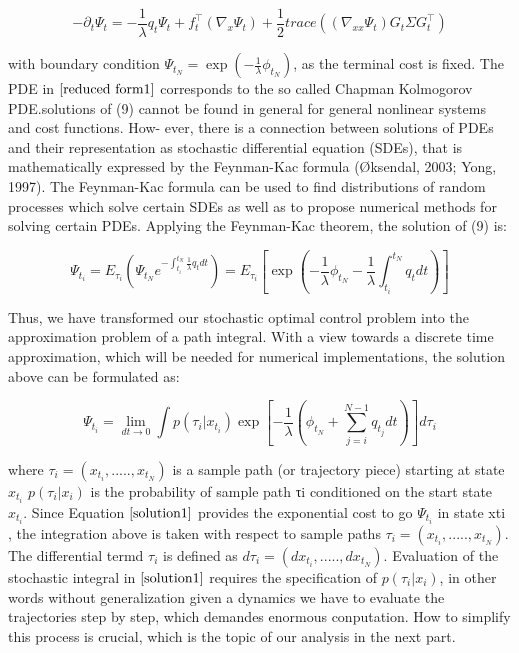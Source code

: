 \documentclass[journal]{IEEEtran}
\begin{document}
\begin{equation}
  -\partial_t \Psi_t = - \frac{1}{\lambda } q_t \Psi_t + f_t^{\top}(\nabla_x \Psi_t) + \frac{1}{2} trace((\nabla_{xx}\Psi_t)G_t \Sigma G_t^{\top})
  \label{reduced form1}
\end{equation}

with boundary condition $\Psi_{t_N} = \exp(-\frac{1}{\lambda} \phi_{t_N})$, as the terminal cost is fixed. The PDE in $\ref{reduced form1}$ 
corresponds to the so called Chapman Kolmogorov PDE.solutions of (9) cannot be found in general for general nonlinear systems and cost functions. How- ever, 
there is a connection between solutions of PDEs and their representation as stochastic differential equation (SDEs), that is mathematically expressed by the 
Feynman-Kac formula (Øksendal, 2003; Yong, 1997). 
The Feynman-Kac formula can be used to 
find distributions of random processes which solve certain SDEs as well as to propose numerical methods for solving certain PDEs. Applying the Feynman-Kac theorem, 
the solution of (9) is:

\begin{equation}
\Psi_{t_i} = E_{\tau_i}(\Psi_{t_N}e^{-\int_{t_i}^{t_N}\frac{1}{\lambda}q_tdt}) = E_{\tau_i}[\exp(-\frac{1}{\lambda}\phi_{t_N}-\frac{1}{\lambda}\int_{t_i}^{t_N}q_tdt)]
\end{equation}

Thus, we have transformed our stochastic optimal control problem into the approximation problem of a path integral. 
With a view towards a discrete time approximation, which will be needed for numerical implementations, the solution above can be formulated as:

\begin{equation}
  \Psi_{t_i} = \lim_{dt\to 0}\int p(\tau_i|x_{t_i}) \exp[-\frac{1}{\lambda}(\phi_{t_N}+\sum_{j=i}^{N-1}q_{t_j}dt)]d\tau_i
  \label{solution1}
\end{equation}

where $\tau_i = (x_{t_i} , ....., x_{t_N} )$ is a sample path (or trajectory piece) starting at state $x_{t_i}$
$p(\tau_i|x_i)$ is the probability of sample path τi conditioned on the start state $x_{t_i}$. 
Since Equation $\ref{solution1}$ provides the exponential cost to go $\Psi_{t_i}$ in state xti , the integration above is taken with respect to sample paths $\tau_i = (x_{t_i} , ....., x_{t_N} )$. 
The differential termd $\tau_i$ is defined as $d\tau_i =(dx_{t_i},.....,dx_{t_N})$. Evaluation of the stochastic integral in $\ref{solution1}$ requires the specification of $p(\tau_i|x_i)$, 
in other words without generalization given a dynamics we have to evaluate the trajectories step by step, which demandes enormous conputation. 
How to simplify this process is crucial, which is the topic of our analysis in the next part.
\end{document}
